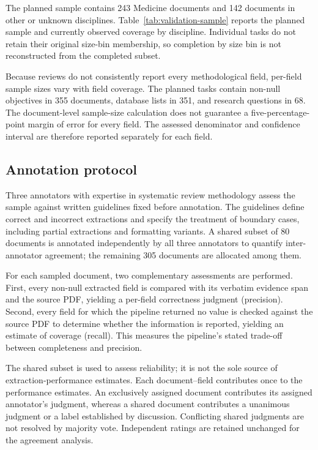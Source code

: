 The planned sample contains 243 Medicine documents and 142 documents in other or unknown disciplines. Table~\ref{tab:validation-sample} reports the planned sample and currently observed coverage by discipline. Individual tasks do not retain their original size-bin membership, so completion by size bin is not reconstructed from the completed subset.



Because reviews do not consistently report every methodological field, per-field sample sizes vary with field coverage. The planned tasks contain non-null objectives in 355 documents, database lists in 351, and research questions in 68. The document-level sample-size calculation does not guarantee a five-percentage-point margin of error for every field. The assessed denominator and confidence interval are therefore reported separately for each field.

\subsection*{Annotation protocol}
Three annotators with expertise in systematic review methodology assess the sample against written guidelines fixed before annotation. The guidelines define correct and incorrect extractions and specify the treatment of boundary cases, including partial extractions and formatting variants. A shared subset of 80 documents is annotated independently by all three annotators to quantify inter-annotator agreement; the remaining 305 documents are allocated among them.

For each sampled document, two complementary assessments are performed. First, every non-null extracted field is compared with its verbatim evidence span and the source PDF, yielding a per-field correctness judgment (precision). Second, every field for which the pipeline returned no value is checked against the source PDF to determine whether the information is reported, yielding an estimate of coverage (recall). This measures the pipeline's stated trade-off between completeness and precision.

The shared subset is used to assess reliability; it is not the sole source of extraction-performance estimates. Each document--field contributes once to the performance estimates. An exclusively assigned document contributes its assigned annotator's judgment, whereas a shared document contributes a unanimous judgment or a label established by discussion. Conflicting shared judgments are not resolved by majority vote. Independent ratings are retained unchanged for the agreement analysis.

